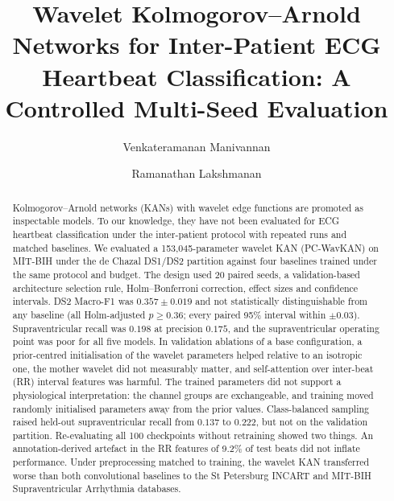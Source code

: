 \documentclass[preprint,12pt]{elsarticle}
\begin{document}
\begin{frontmatter}

\title{Wavelet Kolmogorov--Arnold Networks for Inter-Patient ECG Heartbeat Classification: A Controlled Multi-Seed Evaluation}

\author[scope]{Venkateramanan Manivannan}

\author[iot]{Ramanathan Lakshmanan}



\begin{abstract}
Kolmogorov--Arnold networks (KANs) with wavelet edge functions are promoted as inspectable models. To our knowledge, they have not been evaluated for ECG heartbeat classification under the inter-patient protocol with repeated runs and matched baselines. We evaluated a 153,045-parameter wavelet KAN (PC-WavKAN) on MIT-BIH under the de Chazal DS1/DS2 partition against four baselines trained under the same protocol and budget. The design used 20 paired seeds, a validation-based architecture selection rule, Holm--Bonferroni correction, effect sizes and confidence intervals. DS2 Macro-F1 was $0.357\pm0.019$ and not statistically distinguishable from any baseline (all Holm-adjusted $p\geq0.36$; every paired 95\% interval within $\pm0.03$). Supraventricular recall was $0.198$ at precision $0.175$, and the supraventricular operating point was poor for all five models. In validation ablations of a base configuration, a prior-centred initialisation of the wavelet parameters helped relative to an isotropic one, the mother wavelet did not measurably matter, and self-attention over inter-beat (RR) interval features was harmful. The trained parameters did not support a physiological interpretation: the channel groups are exchangeable, and training moved randomly initialised parameters away from the prior values. Class-balanced sampling raised held-out supraventricular recall from $0.137$ to $0.222$, but not on the validation partition. Re-evaluating all 100 checkpoints without retraining showed two things. An annotation-derived artefact in the RR features of 9.2\% of test beats did not inflate performance. Under preprocessing matched to training, the wavelet KAN transferred worse than both convolutional baselines to the St Petersburg INCART and MIT-BIH Supraventricular Arrhythmia databases.
\end{abstract}


\end{frontmatter}
\end{document}
